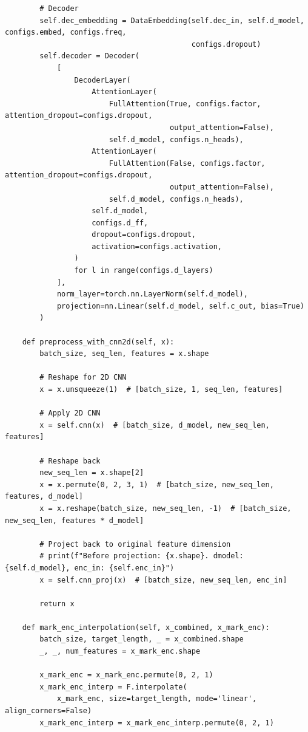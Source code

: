 \documentclass[stu,12pt,floatsintext]{apa7}
\begin{document}
\begin{verbatim}
        # Decoder
        self.dec_embedding = DataEmbedding(self.dec_in, self.d_model, configs.embed, configs.freq,
                                           configs.dropout)
        self.decoder = Decoder(
            [
                DecoderLayer(
                    AttentionLayer(
                        FullAttention(True, configs.factor, attention_dropout=configs.dropout,
                                      output_attention=False),
                        self.d_model, configs.n_heads),
                    AttentionLayer(
                        FullAttention(False, configs.factor, attention_dropout=configs.dropout,
                                      output_attention=False),
                        self.d_model, configs.n_heads),
                    self.d_model,
                    configs.d_ff,
                    dropout=configs.dropout,
                    activation=configs.activation,
                )
                for l in range(configs.d_layers)
            ],
            norm_layer=torch.nn.LayerNorm(self.d_model),
            projection=nn.Linear(self.d_model, self.c_out, bias=True)
        )

    def preprocess_with_cnn2d(self, x):
        batch_size, seq_len, features = x.shape
        
        # Reshape for 2D CNN
        x = x.unsqueeze(1)  # [batch_size, 1, seq_len, features]
        
        # Apply 2D CNN
        x = self.cnn(x)  # [batch_size, d_model, new_seq_len, features]
        
        # Reshape back
        new_seq_len = x.shape[2]
        x = x.permute(0, 2, 3, 1)  # [batch_size, new_seq_len, features, d_model]
        x = x.reshape(batch_size, new_seq_len, -1)  # [batch_size, new_seq_len, features * d_model]
        
        # Project back to original feature dimension
        # print(f"Before projection: {x.shape}. dmodel: {self.d_model}, enc_in: {self.enc_in}")
        x = self.cnn_proj(x)  # [batch_size, new_seq_len, enc_in]
        
        return x

    def mark_enc_interpolation(self, x_combined, x_mark_enc):
        batch_size, target_length, _ = x_combined.shape
        _, _, num_features = x_mark_enc.shape

        x_mark_enc = x_mark_enc.permute(0, 2, 1)
        x_mark_enc_interp = F.interpolate(
            x_mark_enc, size=target_length, mode='linear', align_corners=False)
        x_mark_enc_interp = x_mark_enc_interp.permute(0, 2, 1)


\end{verbatim}
\end{document}
